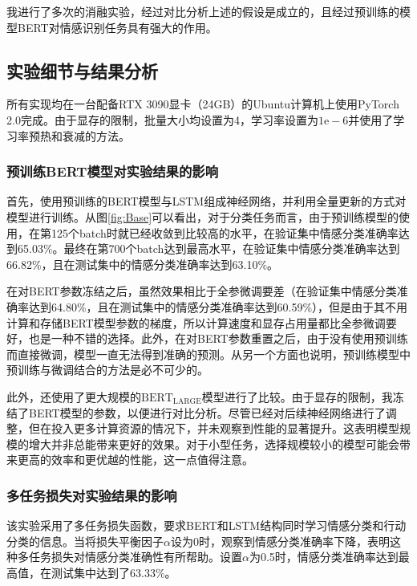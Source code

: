 

我进行了多次的消融实验，经过对比分析上述的假设是成立的，且经过预训练的模型BERT对情感识别任务具有强大的作用。

\subsection{实验细节与结果分析}

所有实现均在一台配备RTX 3090显卡（24GB）的Ubuntu计算机上使用PyTorch 2.0完成。由于显存的限制，批量大小均设置为4，学习率设置为$1\mathrm{e}-6$并使用了学习率预热和衰减的方法。

\subsubsection{预训练BERT模型对实验结果的影响}

首先，使用预训练的BERT模型与LSTM组成神经网络，并利用全量更新的方式对模型进行训练。从图\ref{fig:Base}可以看出，对于分类任务而言，由于预训练模型的使用，在第125个batch时就已经收敛到比较高的水平，在验证集中情感分类准确率达到65.03\%。最终在第700个batch达到最高水平，在验证集中情感分类准确率达到66.82\%，且在测试集中的情感分类准确率达到63.10\%。



在对BERT参数冻结之后，虽然效果相比于全参微调要差（在验证集中情感分类准确率达到64.80\%，且在测试集中的情感分类准确率达到60.59\%），但是由于其不用计算和存储BERT模型参数的梯度，所以计算速度和显存占用量都比全参微调要好，也是一种不错的选择。此外，在对BERT参数重置之后，由于没有使用预训练而直接微调，模型一直无法得到准确的预测。从另一个方面也说明，预训练模型中预训练与微调结合的方法是必不可少的。



此外，还使用了更大规模的$\text{BERT}_\text{LARGE}$模型进行了比较。由于显存的限制，我冻结了BERT模型的参数，以便进行对比分析。尽管已经对后续神经网络进行了调整，但在投入更多计算资源的情况下，并未观察到性能的显著提升。这表明模型规模的增大并非总能带来更好的效果。对于小型任务，选择规模较小的模型可能会带来更高的效率和更优越的性能，这一点值得注意。



\subsubsection{多任务损失对实验结果的影响}

该实验采用了多任务损失函数，要求BERT和LSTM结构同时学习情感分类和行动分类的信息。当将损失平衡因子$\alpha$设为0时，观察到情感分类准确率下降，表明这种多任务损失对情感分类准确性有所帮助。设置$\alpha$为0.5时，情感分类准确率达到最高值，在测试集中达到了63.33\%。

